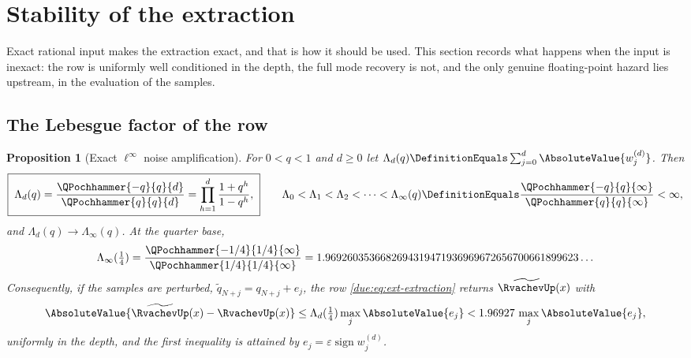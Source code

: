 \documentclass[11pt,oneside]{article}
\theoremstyle{plain}
\newtheorem{proposition}[theorem]{Proposition}
\theoremstyle{definition}
\theoremstyle{remark}
\newcommand{\upn}[1]{\RvachevUp_{#1}}
\newcommand{\qn}[1]{q_{#1}}                                 %
\newcommand{\Wrow}[2]{w^{(#1)}_{#2}}                        %
\begin{document}
\section{Stability of the extraction}
\label{due:sec:stability}

Exact rational input makes the extraction exact, and that is how it should be
used.  This section records what happens when the input is inexact: the row
is uniformly well conditioned in the depth, the full mode recovery is not, and
the only genuine floating-point hazard lies upstream, in the evaluation of the
samples.

\subsection{The Lebesgue factor of the row}

\begin{proposition}[Exact $\ell^{\infty}$ noise amplification]
\label{due:prop:stab-lebesgue}
For $0<q<1$ and $d\ge0$ let
$\Lambda_{d}(q)\DefinitionEquals\sum_{j=0}^{d}\AbsoluteValue{\Wrow{d}{j}}$.  Then
\begin{equation}
 \boxed{\;
 \Lambda_{d}(q)=\frac{\QPochhammer{-q}{q}{d}}{\QPochhammer{q}{q}{d}}
 =\prod_{h=1}^{d}\frac{1+q^{h}}{1-q^{h}},\;}
 \qquad
 \Lambda_{0}<\Lambda_{1}<\Lambda_{2}<\cdots<
 \Lambda_{\infty}(q)\DefinitionEquals\frac{\QPochhammer{-q}{q}{\infty}}{\QPochhammer{q}{q}{\infty}}<\infty,
 \label{due:eq:stab-lebesgue}
\end{equation}
and $\Lambda_{d}(q)\to\Lambda_{\infty}(q)$.  At the quarter base,
\begin{equation}
 \Lambda_{\infty}(\tfrac14)
 =\frac{\QPochhammer{-1/4}{1/4}{\infty}}{\QPochhammer{1/4}{1/4}{\infty}}
 =1.9692603536682694319471936969672656700661899623\ldots
 \label{due:eq:stab-lebesgue-limit}
\end{equation}
Consequently, if the samples are perturbed, $\tilde q_{N+j}=\qn{N+j}+e_{j}$,
the row \cref{due:eq:ext-extraction} returns
$\widetilde{\RvachevUp}(x)$ with
\begin{equation}
 \AbsoluteValue{\widetilde{\RvachevUp}(x)-\RvachevUp(x)}
 \le\Lambda_{d}(\tfrac14)\max_{j}\AbsoluteValue{e_{j}}
 <1.96927\,\max_{j}\AbsoluteValue{e_{j}},
 \label{due:eq:stab-bound}
\end{equation}
uniformly in the depth, and the first inequality is attained by
$e_{j}=\varepsilon\operatorname{sign}\Wrow{d}{j}$.
\end{proposition}
\end{document}
